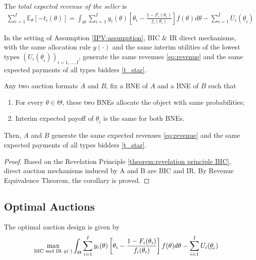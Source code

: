 \documentclass[11pt]{elegantbook_2}
\begin{document}
The \textit{total expected revenue of the seller} is
\begin{equation}
    \begin{aligned}
        \sum_{i=1}^I\mathbb{E}_\theta[-t_i(\theta)]=\int_\Theta \sum_{i=1}^I y_i(\theta)\left[\theta_i-\frac{1-F_i(\theta_i)}{f_i(\theta_i)}\right]f(\theta)d\theta-\sum_{i=1}^IU_i(\underline{\theta}_i)
    \end{aligned}
    \label{eq:revenue}
\end{equation}

\begin{theorem}
    In the setting of Assumption \ref{IPV:assumption}, BIC $\&$ IR direct mechanisms, with the same allocation rule $y(\cdot)$ and the same interim utilities of the lowest types $(U_i(\underline{\theta}_i))_{i=1,...,I}$, generate the same revenues \eqref{eq:revenue} and the same expected payments of all types bidders \eqref{t_star}.
\end{theorem}
\begin{corollary}
    Any two auction formats $A$ and $B$, fix a BNE of $A$ and a BNE of $B$ such that
    \begin{enumerate}
        \item For every $\theta\in\Theta$, these two BNEs allocate the object with same probabilities;
        \item Interim expected payoff of $\underline{\theta}_i$ is the same for both BNEs.
    \end{enumerate}
    Then, $A$ and $B$ generate the same expected revenues \eqref{eq:revenue} and the same expected payments of all types bidders \eqref{t_star}.
\end{corollary}
\begin{proof}
    Based on the Revelation Principle \ref{theorem:revelation principle BIC}, direct auction mechanisms induced by A and B are BIC and IR. By Revenue Equivalence Theorem, the corollary is proved.
\end{proof}

\subsection{Optimal Auctions}
The optimal auction design is given by
\begin{equation}
    \begin{aligned}
        \max_{\textnormal{BIC and IR }y(\cdot)}\int_\Theta \sum_{i=1}^I y_i(\theta)\left[\theta_i-\frac{1-F_i(\theta_i)}{f_i(\theta_i)}\right]f(\theta)d\theta-\sum_{i=1}^IU_i(\underline{\theta}_i)
    \end{aligned}
    \nonumber
\end{equation}
\end{document}
